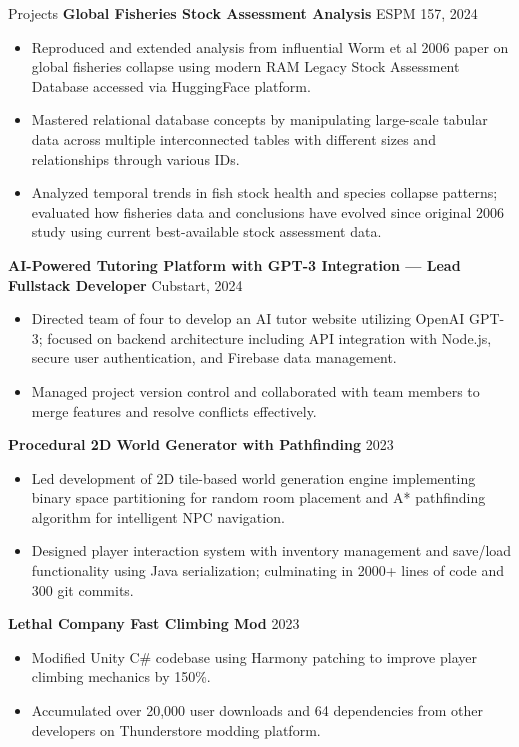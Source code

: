 \documentclass{resume}
\begin{document}
\begin{rSection}{Projects}
\textbf{Global Fisheries Stock Assessment Analysis} \hfill ESPM 157, 2024
\begin{itemize}
  \item Reproduced and extended analysis from influential Worm et al 2006 paper on global fisheries collapse using modern RAM Legacy Stock Assessment Database accessed via HuggingFace platform.
  \item Mastered relational database concepts by manipulating large-scale tabular data across multiple interconnected tables with different sizes and relationships through various IDs.
  \item Analyzed temporal trends in fish stock health and species collapse patterns; evaluated how fisheries data and conclusions have evolved since original 2006 study using current best-available stock assessment data.
\end{itemize}

\textbf{AI-Powered Tutoring Platform with GPT-3 Integration — Lead Fullstack Developer} \hfill Cubstart, 2024
\begin{itemize}
  \item Directed team of four to develop an AI tutor website utilizing OpenAI GPT-3; focused on backend architecture including API integration with Node.js, secure user authentication, and Firebase data management.
  \item Managed project version control and collaborated with team members to merge features and resolve conflicts effectively.
\end{itemize}

\textbf{Procedural 2D World Generator with Pathfinding} \hfill 2023
\begin{itemize}
  \item Led development of 2D tile-based world generation engine implementing binary space partitioning for random room placement and A* pathfinding algorithm for intelligent NPC navigation.
  \item Designed player interaction system with inventory management and save/load functionality using Java serialization; culminating in 2000+ lines of code and 300 git commits.
\end{itemize}

\textbf{Lethal Company Fast Climbing Mod} \hfill 2023
\begin{itemize}
  \item Modified Unity C\# codebase using Harmony patching to improve player climbing mechanics by 150\%.
  \item Accumulated over 20,000 user downloads and 64 dependencies from other developers on Thunderstore modding platform.
\end{itemize}

\end{rSection}
\end{document}
